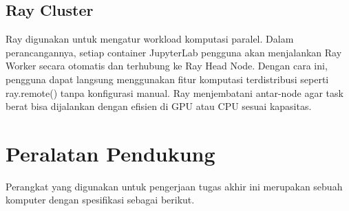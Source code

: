 \subsection{Ray Cluster}

Ray digunakan untuk mengatur workload komputasi paralel. Dalam perancangannya, setiap container JupyterLab pengguna akan menjalankan Ray Worker secara otomatis dan terhubung ke Ray Head Node. Dengan cara ini, pengguna dapat langsung menggunakan fitur komputasi terdistribusi seperti ray.remote() tanpa konfigurasi manual. Ray menjembatani antar-node agar task berat bisa dijalankan dengan efisien di GPU atau CPU sesuai kapasitas.


\section{Peralatan Pendukung}

Perangkat yang digunakan untuk pengerjaan tugas akhir ini merupakan sebuah
komputer dengan spesifikasi sebagai berikut.

